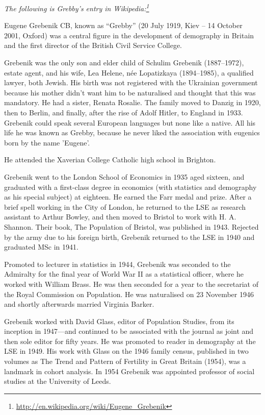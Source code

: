 
\emph{The following is Grebby's entry in Wikipedia:\footnote{\url{http://en.wikipedia.org/wiki/Eugene_Grebenik}}}

Eugene Grebenik CB, known as ``Grebby'' (20 July 1919, Kiev -- 14 October 2001, Oxford) was a central figure in the development of demography in Britain and the first director of the British Civil Service College.

Grebenik was the only son and elder child of Schulim Grebenik (1887--1972), estate agent, and his wife, Lea Helene, n\'{e}e Lopatizkaya (1894--1985), a qualified lawyer, both Jewish. His birth was not registered with the Ukrainian government because his mother didn't want him to be naturalised and thought that this was mandatory.\cite{PopStudies} He had a sister, Renata Rosalie. The family moved to Danzig in 1920, then to Berlin, and finally, after the rise of Adolf Hitler, to England in 1933. Grebenik could speak several European languages but none like a native. All his life he was known as Grebby, because he never liked the association with eugenics born by the name 'Eugene'.\cite{PopStudies}

He attended the Xaverian College Catholic high school in Brighton.\cite{PopStudies}

Grebenik went to the London School of Economics in 1935 aged sixteen, and graduated with a first-class degree in economics (with statistics and demography as his special subject) at eighteen.\cite{PopStudies} He earned the Farr medal and prize. After a brief spell working in the City of London, he returned to the LSE as research assistant to Arthur Bowley, and then moved to Bristol to work with H. A. Shannon. Their book, The Population of Bristol, was published in 1943. Rejected by the army due to his foreign birth, Grebenik returned to the LSE in 1940 and graduated MSc in 1941.

Promoted to lecturer in statistics in 1944, Grebenik was seconded to the Admiralty for the final year of World War II as a statistical officer, where he worked with William Brass. He was then seconded for a year to the secretariat of the Royal Commission on Population. He was naturalised on 23 November 1946 and shortly afterwards married Virginia Barker.\cite{VKDBarkerManuscript}

Grebenik worked with David Glass, editor of Population Studies, from its inception in 1947---and continued to be associated with the journal as joint and then sole editor for fifty years. He was promoted to reader in demography at the LSE in 1949. His work with Glass on the 1946 family census, published in two volumes as The Trend and Pattern of Fertility in Great Britain (1954), was a landmark in cohort analysis. In 1954 Grebenik was appointed professor of social studies at the University of Leeds.

